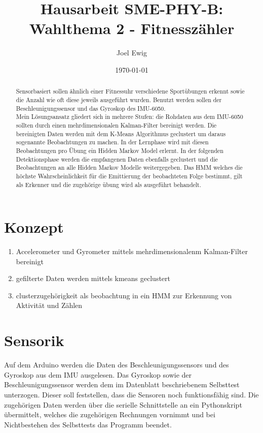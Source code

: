 \documentclass{article}
\begin{document}
\title{Hausarbeit SME-PHY-B: Wahlthema 2 - Fitnessz\"ahler}
\author{Joel Ewig}
\date{\today}
\maketitle
\clearpage

\begin{abstract}
Sensorbasiert sollen \"ahnlich einer Fitnessuhr verschiedene Sport\"ubungen erkennt sowie die Anzahl wie oft diese jeweils ausgef\"uhrt wurden.
Benutzt werden sollen der Beschleunigungssensor und das Gyroskop des IMU-6050.\\
Mein L\"osungsansatz gliedert sich in mehrere Stufen:
die Rohdaten aus dem IMU-6050 sollten durch einen mehrdimensionalen Kalman-Filter bereinigt werden.
Die bereinigten Daten werden mit dem K-Means Algorithmus geclustert um daraus sogenannte \glqq{}Beobachtungen\grqq{} zu machen.
In der Lernphase wird mit diesen Beobachtungen pro \"Ubung ein Hidden Markov Model erlernt.
In der folgenden Detektionsphase werden die empfangenen Daten ebenfalls geclustert und die Beobachtungen an alle Hidden Markov Modelle weitergegeben.
Das HMM welches die h\"ochste Wahrscheinlichkeit f\"ur die Emittierung der beobachteten Folge bestimmt, gilt als Erkenner und die zugeh\"orige \"ubung wird als ausgef\"uhrt behandelt.
\end{abstract}
\clearpage

\tableofcontents
\clearpage

\section{Konzept}
\begin{enumerate}
\item Accelerometer und Gyrometer mittels mehrdimensionalenm Kalman-Filter bereinigt
\item gefilterte Daten werden mittels kmeans geclustert
\item clusterzugeh\"origkeit als beobachtung in ein HMM zur Erkennung von Aktivit\"at und Z\"ahlen
\end{enumerate}

\section{Sensorik}
Auf dem Arduino werden die Daten des Beschleunigungssensors und des Gyroskop aus dem IMU ausgelesen.
Das Gyroskop sowie der Beschleunigungssensor werden dem im Datenblatt beschriebenem Selbsttest unterzogen.
Dieser soll feststellen, dass die Sensoren noch funktionsf\"ahig sind.
Die zugeh\"origen Daten werden \"uber die serielle Schnittstelle an ein Pythonskript \"ubermittelt, welches die zugeh\"origen Rechnungen vornimmt und bei Nichtbestehen des Selbsttests das Programm beendet.\\
\end{document}
